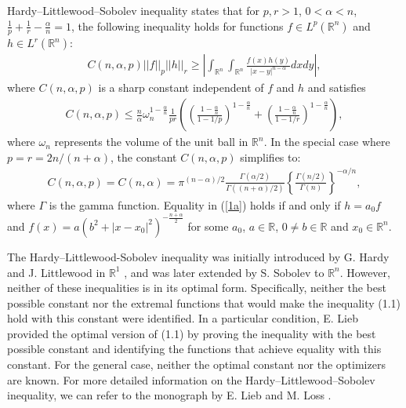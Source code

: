 \documentclass[preprint,12pt]{elsarticle}
\begin{document}
Hardy–Littlewood–Sobolev inequality \cite{ELL01} states that for $p,r>1$, $0 < \alpha < n$, $\frac{1}{p}+\frac{1 }{r}-\frac{\alpha}{n}=1$, the following inequality holds for functions $f\in {L}^{p} (\mathbb{R}^n)$ and $h\in {L}^{r} (\mathbb{R}^n)$:
	\begin{eqnarray}\label{1a}
		C(n, \alpha, p){||f||}_{p}{||h||}_{r}\geq
		\left|\int_{\mathbb{R}^n}\int_{\mathbb{R}^n}\frac{f(x)h(y)}{{| x-y|}^{n-\alpha}}dxdy \right|,
	\end{eqnarray} 
	where $C(n, \alpha, p)$ is a sharp constant independent of $f$ and $h$ and satisfies
	\begin{eqnarray}\label{e1b}
		C(n, \alpha, p)\leq \frac{n}{\alpha}\omega _{n}^{1-\frac{\alpha}{n}}\frac{1}{pr}\left({\left(\frac{1-\frac{\alpha}{n}}{1-1/p}\right)}^{1-\frac{\alpha}{n}}+{\left(\frac{1-\frac{\alpha}{n}}{1-1/r}\right)}^{1-\frac{\alpha}{n}}\right),
	\end{eqnarray} 
	where $\omega _{n} $ represents the volume of the unit ball in $\mathbb{R}^n$.
	In the special case where $p=r=2n/(n+\alpha)$, the constant $C(n, \alpha, p)$ simplifies to:
	\begin{eqnarray*}
		C(n, \alpha, p)=C(n, \alpha)={\pi}^{(n-\alpha) /2}\frac{\Gamma (\alpha /2)}{\Gamma ((n+\alpha) /2)}{\left \{ \frac{\Gamma (n/2)}{\Gamma (n)}\right \}}^{-\alpha /n},
	\end{eqnarray*}
	where $\Gamma $ is the gamma function. 
	Equality in (\ref{1a}) holds if and only if $h= a_{0} f$ and $f(x)=a(b^{2}+|x-x_{0}|^{2})^{-\frac{n+\alpha }{2}}$ for some $a_{0}$, $a\in \mathbb{R}$, $0\neq b \in\mathbb{R}$ and $x_{0}\in \mathbb{R}^n$. %
	
	The Hardy–Littlewood-Sobolev inequality was initially introduced by G. Hardy and J. Littlewood in $\mathbb{R}^1$ \cite{HL28,HL30,HL32}, and was later extended by  S. Sobolev \cite{Sobolev63} to $\mathbb{R}^n$. However, neither of these inequalities is in its optimal form. Specifically, neither the best possible constant nor the extremal functions that would make the inequality (1.1) hold with this constant were identified. In a particular condition, E. Lieb \cite{Lieb83} provided the optimal version of (1.1) by proving the inequality with the best possible constant and identifying the functions that achieve equality with this constant. For the general case, neither the optimal constant nor the optimizers are known. For more detailed information on the Hardy–Littlewood–Sobolev inequality, we can refer to the monograph by E. Lieb and M. Loss \cite{ELL01}.
	 
\end{document}
